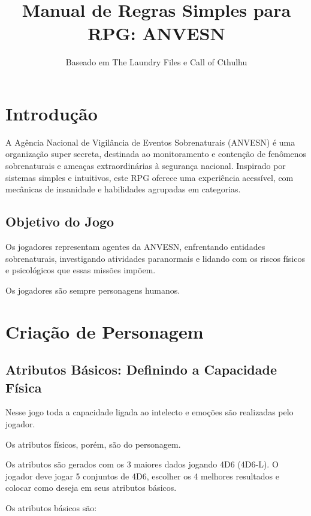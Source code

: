 \documentclass[a4paper,12pt]{book}
\title{Manual de Regras Simples para RPG: ANVESN}
\author{Baseado em The Laundry Files e Call of Cthulhu}
\date{}
\begin{document}
\maketitle

\tableofcontents

\chapter{Introdução}

A Agência Nacional de Vigilância de Eventos Sobrenaturais (ANVESN) é uma organização super secreta, destinada ao monitoramento e contenção de fenômenos sobrenaturais e ameaças extraordinárias à segurança nacional. Inspirado por sistemas simples e intuitivos, este RPG oferece uma experiência acessível, com mecânicas de insanidade e habilidades agrupadas em categorias. 

\section{Objetivo do Jogo}

Os jogadores representam agentes da ANVESN, enfrentando entidades sobrenaturais, investigando atividades paranormais e lidando com os riscos físicos e psicológicos que essas missões impõem.

Os jogadores são sempre personagens humanos.

\chapter{Criação de Personagem}

\section{Atributos Básicos: Definindo a Capacidade Física}

Nesse jogo toda a capacidade ligada ao intelecto e emoções são realizadas pelo jogador. 

Os atributos físicos, porém, são do personagem.

Os atributos são gerados com os 3 maiores dados jogando 4D6 (4D6-L). O jogador deve jogar 5 conjuntos de 4D6, escolher os 4 melhores resultados e colocar como deseja em seus atributos básicos.

Os atributos básicos são:
\end{document}
